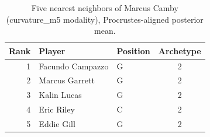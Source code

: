 \begin{table}[htbp]
  \centering\small
  \begin{tabular}{rllc}
    \toprule
    Rank & Player & Position & Archetype \\
    \midrule
    1 & Facundo Campazzo & G & 2 \\
    2 & Marcus Garrett & G & 2 \\
    3 & Kalin Lucas & G & 2 \\
    4 & Eric Riley & C & 2 \\
    5 & Eddie Gill & G & 2 \\
    \bottomrule
  \end{tabular}
  \caption{Five nearest neighbors of Marcus Camby (curvature_m5 modality), Procrustes-aligned posterior mean.}
  \label{tab:Marcus_Camby_neighbors_curvature_m5}
\end{table}

